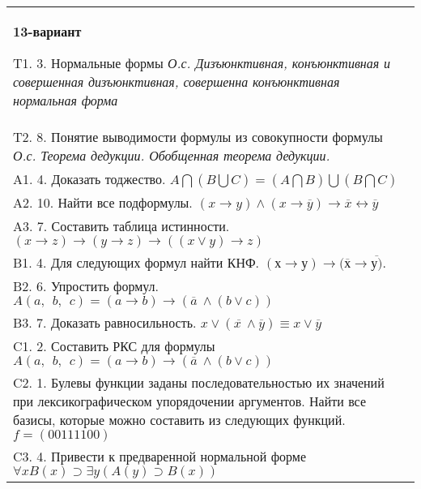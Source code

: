 \documentclass{article}
\begin{document}
\begin{tabular}{m{17cm}}
\textbf{13-вариант}
\newline

T1. 3. Нормальные формы \emph{О.с. Дизъюнктивная, конъюнктивная и совершенная дизъюнктивная, совершенна конъюнктивная нормальная форма} \\
T2. 8. Понятие выводимости формулы из совокупности формулы \emph{О.с. Теорема дедукции. Обобщенная теорема дедукции.} \\
A1. 4. Доказать тоджество. \(A\bigcap(B\bigcup C) = (A\bigcap B)\bigcup(B\bigcap C)\) \\
A2. 10. Найти все подформулы. \((x \rightarrow y) \land (x \rightarrow \overline{y}) \rightarrow \overline{x} \leftrightarrow \overline{y}\) \\
A3. 7. Составить таблица истинности. \((x \rightarrow z) \rightarrow (y \rightarrow z) \rightarrow ((x \vee y) \rightarrow z)\) \\
B1. 4. Для следующих формул найти КНФ. \((х \rightarrow у) \rightarrow (\overline{х} \rightarrow \overline{у)}\). \\
B2. 6. Упростить формул. \(A(a,\ \ b,\ \ c) = (a \rightarrow b) \rightarrow (\overline{a}\  \land (b \vee c))\) \\
B3. 7. Доказать равносильность. \(x \vee \left( \overline{x\ } \land \overline{y} \right) \equiv x \vee \overline{y}\) \\
C1. 2. Составить РКС для формулы \(A(a,\ \ b,\ \ c) = (a \rightarrow b) \rightarrow (\overline{a}\  \land (b \vee c))\) \\
C2. 1. Булевы функции заданы последовательностью их значений при лексикографическом упорядочении аргументов. Найти все базисы, которые можно составить из следующих функций.\(f = (00111100)\) \\
C3. 4. Привести к предваренной нормальной форме \(\forall xB(x) \supset \exists y(A(y) \supset B(x))\) \\

\end{tabular}
\vspace{1cm}
\end{document}
